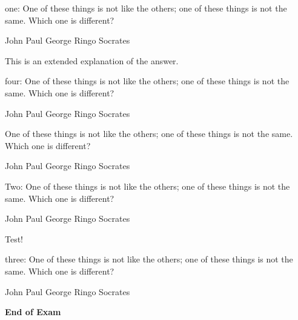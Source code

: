 \documentclass[]{exam}
\newcommand{\sol}[1]{{\ifprintanswers \color{red} #1 \fi}}
\newcommand{\questionp}[1]{\begin{minipage}{\textwidth}
  \question #1
  \end{minipage}}
\begin{document}
\begin{questions}




\questionp{
one: One of these things is not like the others; one of these
things is not the same. Which one is different?

\begin{randomizechoices}
\choice John
\choice Paul
\choice George
\choice Ringo
\CorrectChoice Socrates
\end{randomizechoices}
\sol{This is an extended explanation of the answer.}
}

\questionp{
four: One of these things is not like the others; one of these
things is not the same. Which one is different?

\begin{randomizechoices}
\choice John
\choice Paul
\choice George
\choice Ringo
\CorrectChoice Socrates
\end{randomizechoices}
}

\questionp{
One of these things is not like the others; one of these
things is not the same. Which one is different?

\begin{randomizechoices}
\choice John
\choice Paul
\choice George
\choice Ringo
\CorrectChoice Socrates
\end{randomizechoices}
}

\questionp{
Two: One of these things is not like the others; one of these
things is not the same. Which one is different?

\begin{randomizechoices}
\choice John
\choice Paul
\choice George
\choice Ringo
\CorrectChoice Socrates
\end{randomizechoices}

\sol{Test!}
}

\questionp{
three: One of these things is not like the others; one of these
things is not the same. Which one is different?

\begin{randomizechoices}
\choice John
\choice Paul
\choice George
\choice Ringo
\CorrectChoice Socrates
\end{randomizechoices}
}



\end{questions}


\vspace*{\fill}
\Huge \begin{center} \textbf{End of Exam} \end{center}
\end{document}
